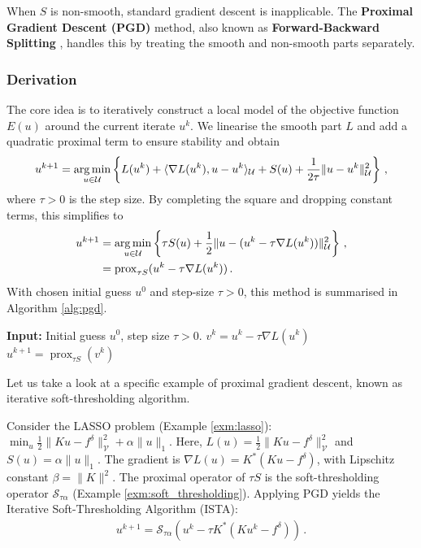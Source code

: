 When $S$ is non-smooth, standard gradient descent is inapplicable. The \textbf{Proximal Gradient Descent (PGD)} method, also known as \textbf{Forward-Backward Splitting} \cite{Lions1979Splitting}, handles this by treating the smooth and non-smooth parts separately.

\subsubsection{Derivation}
The core idea is to iteratively construct a local model of the objective function $E(u)$ around the current iterate $u^k$. We linearise the smooth part $L$ and add a quadratic proximal term to ensure stability and obtain
\begin{align*}
u^{k+1} = \operatorname*{arg\,min}_{u \in \mathcal{U}} \left\{ L(u^k) + \langle \nabla L(u^k), u - u^k \rangle_\mathcal{U} + S(u) + \frac{1}{2\tau}\|u - u^k\|_\mathcal{U}^2 \right\} \, ,
\end{align*}
where $\tau > 0$ is the step size. By completing the square and dropping constant terms, this simplifies to
\begin{align*}
u^{k+1} &= \operatorname*{arg\,min}_{u \in \mathcal{U}} \left\{ \tau S(u) + \frac{1}{2} \|u - (u^k - \tau \nabla L(u^k))\|_\mathcal{U}^2 \right\} \, , \\
&= \operatorname{prox}_{\tau S}(u^k - \tau \nabla L(u^k)) \, .
\end{align*}
With chosen initial guess $u^0$ and step-size $\tau > 0$, this method is summarised in Algorithm \ref{alg:pgd}.
\begin{algorithm}
\caption{Proximal Gradient Descent (PGD)}\label{alg:pgd}
\begin{algorithmic}
\State \textbf{Input:} Initial guess $u^0$, step size $\tau > 0$.
\State $v^k = u^k - \tau \nabla L(u^k)$ 
\State $u^{k+1} = \operatorname{prox}_{\tau S}(v^k)$ 
\EndFor
\end{algorithmic}
\end{algorithm}

Let us take a look at a specific example of proximal gradient descent, known as iterative soft-thresholding algorithm.

\begin{exm}\label{exm:ista}\normalfont
Consider the LASSO problem (Example \ref{exm:lasso}): $\min_{u} \frac{1}{2}\|Ku - f^\delta\|_\mathcal{V}^2 + \alpha \|u\|_1$. Here, $L(u) = \frac{1}{2}\|Ku - f^\delta\|_\mathcal{V}^2$ and $S(u) = \alpha \|u\|_1$. The gradient is $\nabla L(u) = K^*(Ku - f^\delta)$, with Lipschitz constant $\beta = \|K\|^2$. The proximal operator of $\tau S$ is the soft-thresholding operator $\mathcal{S}_{\tau\alpha}$ (Example \ref{exm:soft_thresholding}). Applying PGD yields the Iterative Soft-Thresholding Algorithm (ISTA):
\begin{align*}
u^{k+1} = \mathcal{S}_{\tau\alpha}(u^k - \tau K^*(Ku^k - f^\delta)) \, .
\end{align*}
\end{exm}

